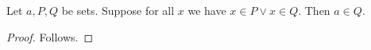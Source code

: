 \begin{proposition}\label{obvious_missing_universal_premise}
    Let $a,P,Q$ be sets.
    Suppose for all $x$ we have $x\in P\lor x\in Q$.
    Then $a\in Q$.
\end{proposition}
\begin{proof}
    Follows.
\end{proof}
